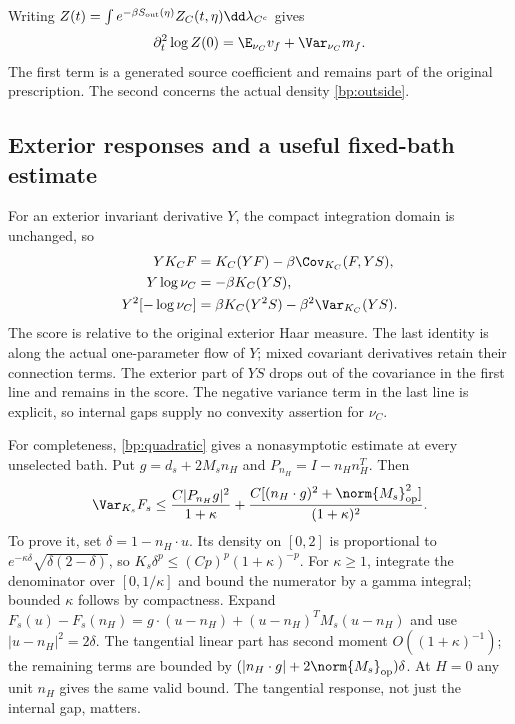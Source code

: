 Writing $Z(t)=\int e^{-\beta S_{\rm out}(\eta)}Z_C(t,\eta)\dd\lambda_{C^c}$ gives
\begin{equation}
 \partial_t^2\log Z(0)=\E_{\nu_C}v_f+\Var_{\nu_C}m_f.
 \label{bp:pressuredecomposition}
\end{equation}
The first term is a generated source coefficient and remains part of the original prescription. The second concerns the actual density \eqref{bp:outside}.

\subsection{Exterior responses and a useful fixed-bath estimate}

For an exterior invariant derivative $Y$, the compact integration domain is unchanged, so
\begin{align}
 YK_CF&=K_C(YF)-\beta\Cov_{K_C}(F,YS),\notag\\
 Y\log\nu_C&=-\beta K_C(YS),\notag\\
 Y^2[-\log\nu_C]&=\beta K_C(Y^2S)-\beta^2\Var_{K_C}(YS).
 \label{bp:responses}
\end{align}
The score is relative to the original exterior Haar measure. The last identity is along the actual one-parameter flow of $Y$; mixed covariant derivatives retain their connection terms. The exterior part of $YS$ drops out of the covariance in the first line and remains in the score. The negative variance term in the last line is explicit, so internal gaps supply no convexity assertion for $\nu_C$.

For completeness, \eqref{bp:quadratic} gives a nonasymptotic estimate at every unselected bath. Put $g=d_s+2M_sn_H$ and $P_{n_H}=I-n_Hn_H^T$. Then
\begin{equation}
 \Var_{K_s}F_s\le
 \frac{C|P_{n_H}g|^2}{1+\kappa}
 +\frac{C[(n_H\cdot g)^2+\norm{M_s}_{\rm op}^2]}{(1+\kappa)^2}.
 \label{bp:anisotropicvariance}
\end{equation}
To prove it, set $\delta=1-n_H\cdot u$. Its density on $[0,2]$ is proportional to $e^{-\kappa\delta}\sqrt{\delta(2-\delta)}$, so $K_s\delta^p\le(Cp)^p(1+\kappa)^{-p}$. For $\kappa\ge1$, integrate the denominator over $[0,1/\kappa]$ and bound the numerator by a gamma integral; bounded $\kappa$ follows by compactness. Expand
$F_s(u)-F_s(n_H)=g\cdot(u-n_H)+(u-n_H)^TM_s(u-n_H)$ and use $|u-n_H|^2=2\delta$. The tangential linear part has second moment $O((1+\kappa)^{-1})$; the remaining terms are bounded by $(|n_H\cdot g|+2\norm{M_s}_{\rm op})\delta$. At $H=0$ any unit $n_H$ gives the same valid bound. The tangential response, not just the internal gap, matters.

